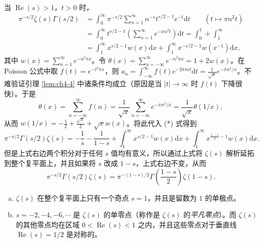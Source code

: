 \begin{sloppypar}
当 $\operatorname{Re}(s)>1$，$t>0$ 时，
\begin{align*}
  \pi^{-s/2}\zeta(s)\Gamma(s/2)
  &=\int_0^{\infty}\pi^{-s/2}\sum_{n=1}^{\infty}n^{-s}t^{s/2-1}e^{-t}\mathrm{d}t\qquad(t\mapsto\pi n^2t)\\
  &=\int_0^{\infty}t^{s/2-1}\left(\sum_{n=1}^{\infty}e^{-\pi n^2t}\right)\mathrm{d}t
  =\int_0^1+\int_1^{\infty}\\
  &=\int_1^{\infty}x^{s/2-1}w(x)\mathrm{d}x+\int_1^{\infty}x^{-s/2-1}w(x^{-1})\mathrm{d}x,\tag{*}
\end{align*}
其中 $w(x)=\sum_{n=1}^{\infty}e^{-n^2\pi x}$。令 $\theta(x)=\sum_{n=-\infty}^{\infty}e^{-n^2\pi x}=1+2w(x)$。在 Poisson 公式中取 $f(t)=e^{-t^2\pi x}$，则 $a_n=\int_{-\infty}^{\infty}f(t)e^{-2\pi int}\mathrm{d}t=\frac{1}{\sqrt{x}}e^{-\pi n^2/x}$。不难验证引理 \ref{lem:ch4-4} 中诸条件均成立（原因是当 $|t|\to\infty$ 时 $f(t)$ 下降很快）。于是
\[
  \theta(x)=\sum_{n=-\infty}^{\infty}f(n)=\frac{1}{\sqrt{x}}\sum_{n=-\infty}^{\infty}e^{-\pi n^2/x}=\frac{1}{\sqrt{x}}\theta(1/x),
\]
从而 $w(1/x)=-\frac{1}{2}+\frac{\sqrt{x}}{2}+\sqrt{x}w(x)$。将此代入 (*) 式得到
\[
  \pi^{-s/2}\Gamma(s/2)\zeta(s)
  =-\frac{1}{s}-\frac{1}{1-s}+\int_1^{\infty}x^{s/2-1}w(x)\mathrm{d}x+\int_1^{\infty}x^{\frac{1-s}{2}-1}w(x)\mathrm{d}x.
\]
但是上式右边两个积分对于任何 $s$ 值均有意义，所以通过上式将 $\zeta(s)$ 解析延拓到整个复平面上，并且如果将 $s$ 改成 $1-s$，上式右边不变，从而
\[
  \pi^{-s/2}\Gamma(s/2)\zeta(s)=\pi^{-(1-s)/2}\Gamma\left(\frac{1-s}{2}\right)\zeta(1-s).
\]
\end{sloppypar}

\begin{corollarynonum}
\begin{enumerate}[(a)]
  \item $\zeta(s)$ 在整个复平面上只有一个奇点 $s=1$，并且是留数为 $1$ 的单极点。
  \item $s=-2,-4,-6,\cdots$ 是 $\zeta(s)$ 的单零点（称作是 $\zeta(s)$ 的\emph{平凡零点}）。而 $\zeta(s)$ 的其他零点均在区域 $0<\operatorname{Re}(s)<1$ 之内，并且这些零点对于垂直线 $\operatorname{Re}(s)=1/2$ 是对称的。
\end{enumerate}
\end{corollarynonum}

